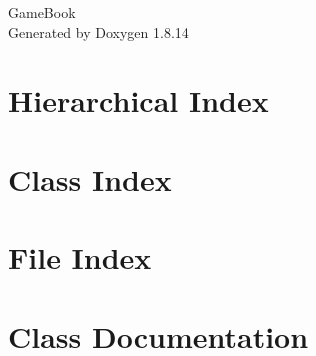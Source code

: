 \documentclass[twoside]{book}
\newcommand{\+}{\discretionary{\mbox{\scriptsize$\hookleftarrow$}}{}{}}
\newcommand{\clearemptydoublepage}{%
  \newpage{\pagestyle{empty}\cleardoublepage}%
}
\begin{document}
\hypersetup{pageanchor=false,
             bookmarksnumbered=true,
             pdfencoding=unicode
            }
\begin{titlepage}
\vspace*{7cm}
\begin{center}%
{\Large Game\+Book }\\
\vspace*{1cm}
{\large Generated by Doxygen 1.8.14}\\
\end{center}
\end{titlepage}
\clearemptydoublepage
{}
\tableofcontents
\clearemptydoublepage
{}
\hypersetup{pageanchor=true}

\chapter{Hierarchical Index}

\chapter{Class Index}

\chapter{File Index}

\chapter{Class Documentation}























\end{document}

